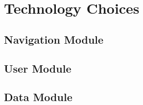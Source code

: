 \documentclass[11pt]{article}
\begin{document}
\section{Technology Choices}

\subsection{Navigation Module}

\subsection{User Module}

\subsection{Data Module}
\end{document}
